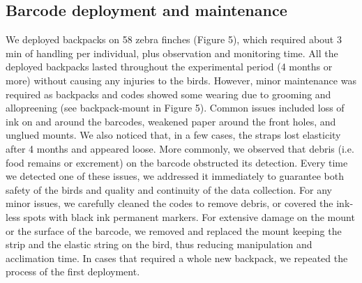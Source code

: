\documentclass[11pt,a4paper,oneside]{book}
\begin{document}
\subsection{Barcode deployment and maintenance}
We deployed backpacks on 58 zebra finches (Figure 5), which required about 3 min of handling per individual, plus observation and monitoring time. All the deployed backpacks lasted throughout the experimental period (4 months or more) without causing any injuries to the birds. However, minor maintenance was required as backpacks and codes showed some wearing due to grooming and allopreening (see backpack‐mount in Figure 5). Common issues included loss of ink on and around the barcodes, weakened paper around the front holes, and unglued mounts. We also noticed that, in a few cases, the straps lost elasticity after 4 months and appeared loose. More commonly, we observed that debris (i.e. food remains or excrement) on the barcode obstructed its detection. Every time we detected one of these issues, we addressed it immediately to guarantee both safety of the birds and quality and continuity of the data collection. For any minor issues, we carefully cleaned the codes to remove debris, or covered the ink‐less spots with black ink permanent markers. For extensive damage on the mount or the surface of the barcode, we removed and replaced the mount keeping the strip and the elastic string on the bird, thus reducing manipulation and acclimation time. In cases that required a whole new backpack, we repeated the process of the first deployment.
\end{document}
